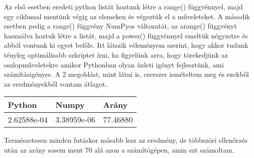 \documentclass{article}
\theoremstyle{definition}
\theoremstyle{theorem}
\begin{document}

Az első esetben eredeti python listát hoztunk létre a range() függvénnyel, majd egy ciklussal mentünk végig az elemeken és végeztük el a műveleteket. A második esetben pedig a range() függvény NumPyos változatát, az arange() függvényt használva hoztuk létre a listát, majd a power() függvénnyel emeltük négyzetre és abból vontunk ki egyet belőle. Itt látszik véleményem szerint, hogy akkor tudunk tényleg optimálisabb szkriptet írni, ha figyelünk arra, hogy törekedjünk az oszlopműveletekre amikor Pythonban olyan üzleti igényt fejlesztünk, ami számításigényes.\newline
A 2 megoldást, mint látni is, ezerszer ismételtem meg és ezekből az eredményekből vontam átlagot.\newline


\begin{table}[H]
\centering
\begin{tabular}{|l|l|l|}
\hline
Python      & Numpy       & Arány    \\ \hline
2.62588e-04 & 3.38959e-06 & 77.46880 \\ \hline
\end{tabular}
\end{table}
Természetesen minden futáskor másabb lesz az eredmény, de többszöri ellenőrzés után az arány sosem ment 70 alá azon a számítógépen, amin ezt számoltam.
\end{document}
